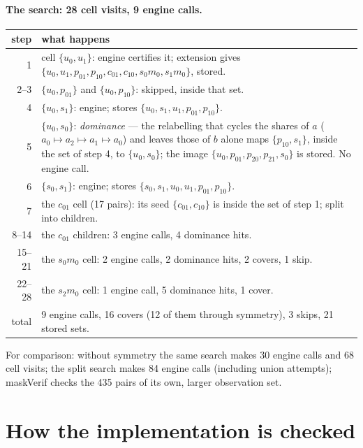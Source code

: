\documentclass[11pt,a4paper]{article}
\theoremstyle{definition}
\theoremstyle{remark}
\begin{document}
\paragraph{The search: 28 cell visits, 9 engine calls.}
\begin{center}\small
\begin{tabular}{@{}rp{11.2cm}@{}}
\toprule
step & what happens \\
\midrule
1 & cell $\{u_0,u_1\}$: engine certifies it; extension gives
    $\{u_0,u_1,p_{01},p_{10},c_{01},c_{10},s_0m_0,s_1m_0\}$, stored.\\
2--3 & $\{u_0,p_{01}\}$ and $\{u_0,p_{10}\}$: skipped, inside that set.\\
4 & $\{u_0,s_1\}$: engine; stores $\{u_0,s_1,u_1,p_{01},p_{10}\}$.\\
5 & $\{u_0,s_0\}$: \emph{dominance} --- the relabelling that cycles the shares of $a$
    ($a_0\mapsto a_2\mapsto a_1\mapsto a_0$) and leaves those of $b$ alone maps $\{p_{10},s_1\}$,
    inside the set of step 4, to $\{u_0,s_0\}$; the image $\{u_0,p_{01},p_{20},p_{21},s_0\}$ is
    stored.  No engine call.\\
6 & $\{s_0,s_1\}$: engine; stores $\{s_0,s_1,u_0,u_1,p_{01},p_{10}\}$.\\
7 & the $c_{01}$ cell (17 pairs): its seed $\{c_{01},c_{10}\}$ is inside the set of step 1;
    split into children.\\
8--14 & the $c_{01}$ children: 3 engine calls, 4 dominance hits.\\
15--21 & the $s_0m_0$ cell: 2 engine calls, 2 dominance hits, 2 covers, 1 skip.\\
22--28 & the $s_2m_0$ cell: 1 engine call, 5 dominance hits, 1 cover.\\
\midrule
total & 9 engine calls, 16 covers (12 of them through symmetry), 3 skips, 21 stored sets.\\
\bottomrule
\end{tabular}
\end{center}
For comparison: without symmetry the same search makes 30 engine calls and 68 cell visits;
the split search makes 84 engine calls (including union attempts); maskVerif checks the 435
pairs of its own, larger observation set.

\section{How the implementation is checked}\label{sec:checks}
\end{document}
